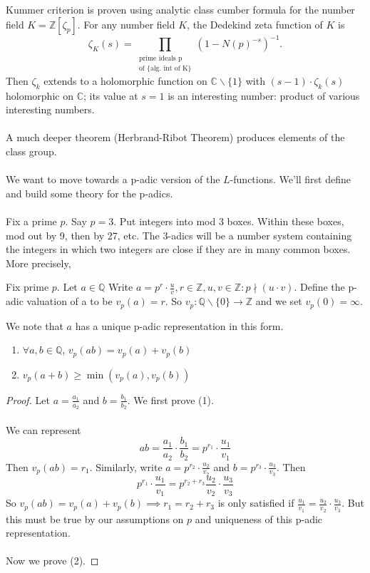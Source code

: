 Kummer criterion is proven using analytic class cumber formula for the number field $K=\mathbb{Z}[\zeta_p]$.
For any number field $K$, the Dedekind zeta function of $K$ is 
\[\zeta_K(s)=\prod_{\substack{\text{prime ideals
p }\\\text{of }\{\text{alg. int of K\}}}}(1-N(p)^{-s})^{-1}
.\]
Then $\zeta_k$ extends to a holomorphic function on $\mathbb{C}\backslash\{1\}$
with $(s-1)\cdot \zeta_k(s)$ holomorphic on $\mathbb{C}$; its value at $s=1$ is an interesting number: product of 
various interesting numbers. \\\\
A much deeper theorem (Herbrand-Ribot Theorem) produces elements of the class group.\\\\
We want to move towards a p-adic version of the $L$-functions. We'll first define 
and build some theory for the p-adics. \\\\
Fix a prime $p$. Say $p=3$. Put integers into mod 3 boxes. Within these boxes, mod out by 9, then by 27, etc.
The 3-adics will be a number system containing the integers in which two integers are close if they are in many common boxes.
More precisely, 
\begin{definition}
    Fix prime $p$. Let $a\in\mathbb{Q}$ Write $a=p^r\cdot \frac{u}{v}, r\in\mathbb{Z},u,v\in\mathbb{Z}: p\nmid (u\cdot v)$.
    Define the p-adic valuation of a to be $v_p(a)=r$. So $v_p:\mathbb{Q}\backslash\{0\}\rightarrow \mathbb{Z}$ and
    we set $v_p(0)=\infty$.
\end{definition}
We note that $a$ has a unique p-adic representation in this form.
\begin{lemma}
    \begin{enumerate}
        \item $\forall a,b\in\mathbb{Q}$, $v_p(ab)=v_p(a)+v_p(b)$
        \item $v_p(a+b)\geq \min{(v_p(a),v_p(b))}$
    \end{enumerate}
\end{lemma}
\begin{proof}
    Let $a=\frac{a_1}{a_2}$ and $b=\frac{b_1}{b_2}$.
    We first prove (1). \\\\
    We can represent
    \[
        ab =  \frac{a_1}{a_2}\cdot\frac{b_1}{b_2}=p^{r_1}\cdot\frac{u_1}{v_1}
    \]
    Then $v_p(ab)=r_1$. Similarly, write $a=p^{r_2}\cdot \frac{u_2}{v_2}$ and 
    $b=p^{r_3}\cdot \frac{u_3}{v_3}$. Then 
    \[
        p^{r_1}\cdot \frac{u_1}{v_1}=p^{r_2+r_3}\frac{u_2}{v_2}\cdot\frac{u_3}{v_3}
    \]  
    So $v_p(ab)=v_p(a)+v_p(b)\implies r_1=r_2+r_3$ is only satisfied if 
    $\frac{u_1}{v_1}=\frac{u_2}{v_2}\cdot\frac{u_3}{v_3}$. But this must be true by 
    our assumptions on $p$ and uniqueness of this p-adic representation.
    \\\\
    Now we prove (2).
\end{proof}
